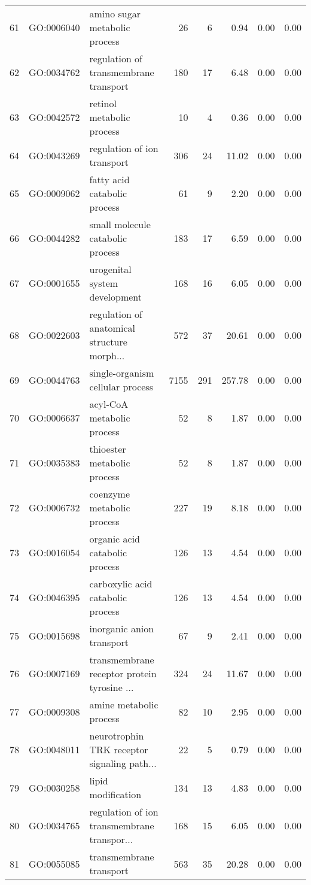 \begin{table}[ht]
\begin{tabular}{rllrrrrr}
  61 & GO:0006040 & amino sugar metabolic process &  26 &   6 & 0.94 & 0.00 & 0.00 \\ 
  62 & GO:0034762 & regulation of transmembrane transport & 180 &  17 & 6.48 & 0.00 & 0.00 \\ 
  63 & GO:0042572 & retinol metabolic process &  10 &   4 & 0.36 & 0.00 & 0.00 \\ 
  64 & GO:0043269 & regulation of ion transport & 306 &  24 & 11.02 & 0.00 & 0.00 \\ 
  65 & GO:0009062 & fatty acid catabolic process &  61 &   9 & 2.20 & 0.00 & 0.00 \\ 
  66 & GO:0044282 & small molecule catabolic process & 183 &  17 & 6.59 & 0.00 & 0.00 \\ 
  67 & GO:0001655 & urogenital system development & 168 &  16 & 6.05 & 0.00 & 0.00 \\ 
  68 & GO:0022603 & regulation of anatomical structure morph... & 572 &  37 & 20.61 & 0.00 & 0.00 \\ 
  69 & GO:0044763 & single-organism cellular process & 7155 & 291 & 257.78 & 0.00 & 0.00 \\ 
  70 & GO:0006637 & acyl-CoA metabolic process &  52 &   8 & 1.87 & 0.00 & 0.00 \\ 
  71 & GO:0035383 & thioester metabolic process &  52 &   8 & 1.87 & 0.00 & 0.00 \\ 
  72 & GO:0006732 & coenzyme metabolic process & 227 &  19 & 8.18 & 0.00 & 0.00 \\ 
  73 & GO:0016054 & organic acid catabolic process & 126 &  13 & 4.54 & 0.00 & 0.00 \\ 
  74 & GO:0046395 & carboxylic acid catabolic process & 126 &  13 & 4.54 & 0.00 & 0.00 \\ 
  75 & GO:0015698 & inorganic anion transport &  67 &   9 & 2.41 & 0.00 & 0.00 \\ 
  76 & GO:0007169 & transmembrane receptor protein tyrosine ... & 324 &  24 & 11.67 & 0.00 & 0.00 \\ 
  77 & GO:0009308 & amine metabolic process &  82 &  10 & 2.95 & 0.00 & 0.00 \\ 
  78 & GO:0048011 & neurotrophin TRK receptor signaling path... &  22 &   5 & 0.79 & 0.00 & 0.00 \\ 
  79 & GO:0030258 & lipid modification & 134 &  13 & 4.83 & 0.00 & 0.00 \\ 
  80 & GO:0034765 & regulation of ion transmembrane transpor... & 168 &  15 & 6.05 & 0.00 & 0.00 \\ 
  81 & GO:0055085 & transmembrane transport & 563 &  35 & 20.28 & 0.00 & 0.00 \\ 

\end{tabular}
\end{table}
